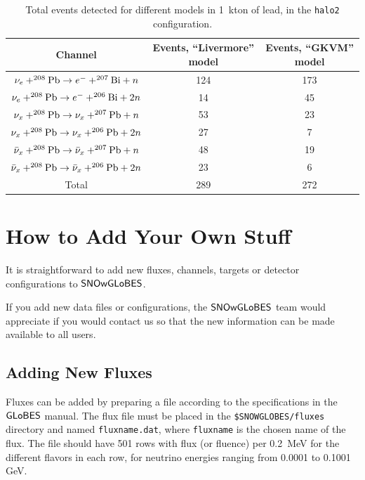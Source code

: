 \documentclass[12pt]{article}
\newcommand{\globes}{\sf{GLoBES}}
\newcommand{\snowglobes}{\sf{SNOwGLoBES}}
\begin{document}
\begin{table}[h]
\centering
\begin{tabular}{|c|c|c|} \hline
Channel & Events, ``Livermore'' model & Events, ``GKVM'' model  \\
\hline

$\nu_e + ^{208}{\rm Pb} \rightarrow e^- + ^{207}{\rm Bi} + n$ & 124  &  173\\
$\nu_e + ^{208}{\rm Pb} \rightarrow e^- + ^{206}{\rm Bi} + 2n$ & 14   & 45 \\
$\nu_x + ^{208}{\rm Pb} \rightarrow \nu_x + ^{207}{\rm Pb} + n$ & 53  & 23 \\
$\nu_x + ^{208}{\rm Pb} \rightarrow \nu_x + ^{206}{\rm Pb} + 2n$ & 27  & 7 \\
$\bar{\nu}_x + ^{208}{\rm Pb} \rightarrow \bar{\nu}_x + ^{207}{\rm Pb} + n$ & 48  & 19 \\
$\bar{\nu}_x + ^{208}{\rm Pb} \rightarrow \bar{\nu}_x + ^{206}{\rm Pb} + 2n$ & 23 & 6 \\



\hline

Total & 289  & 272  \\ \hline
\end{tabular}
\caption{Total events detected for different models in 1~kton of lead, in the \texttt{halo2} configuration. }
\label{tab:leadtable}
\end{table}



\section{How to Add Your Own Stuff}\label{addingnew}

It is straightforward to add new fluxes, channels, targets or detector configurations to $\snowglobes$. 

If you add new data files or configurations, the $\snowglobes$ team would appreciate if you would contact us so that the new information can be made available to all users.

\subsection{Adding New Fluxes}

Fluxes can be added by preparing a file according to the
specifications in the $\globes$ manual.  The flux file must be placed
in the \texttt{\$SNOWGLOBES/fluxes} directory and named
\texttt{fluxname.dat}, where \texttt{fluxname} is the chosen name
of the flux.   The file should have 501 rows with flux (or fluence) per 0.2~MeV for the different flavors in each row, for neutrino energies ranging from 0.0001 to 0.1001 GeV.
\end{document}
